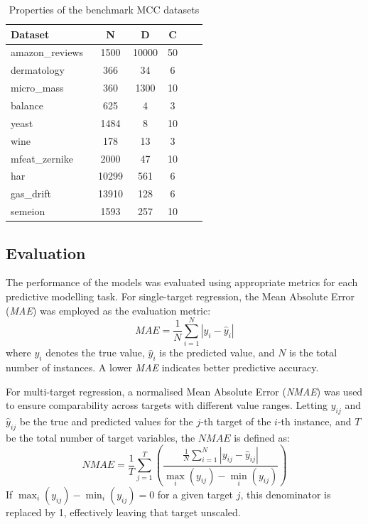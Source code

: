 \documentclass[3p,review,authoryear]{elsarticle}
\begin{document}
\begin{table}[h!]
\centering
\caption{Properties of the benchmark MCC datasets}
\label{tab:mcc}
\begin{tabular}{@{}lccccc@{}}
\toprule
\textbf{Dataset}   & \textbf{N} & \textbf{D} & \textbf{C}     \\ \midrule
amazon\_reviews~\citep{openml}                  & 1500         & 10000   &  50     \\
dermatology~\citep{openml}                     & 366         & 34     &  6   \\
micro\_mass~\citep{openml}                   & 360         & 1300      &   10    \\
balance~\citep{openml}                   & 625         & 4       & 3  \\
yeast~\citep{mulan}                   & 1484         & 8    & 10  \\
wine~\citep{openml}             &  178        & 13     &  3   \\
mfeat\_zernike~\citep{openml}                & 2000         & 47   &  10   \\
har~\citep{openml}                  & 10299         & 561        &  6   \\
gas\_drift~\citep{openml}           & 13910         & 128      &   6   \\
semeion~\citep{openml}       & 1593         & 257    &   10  \\ \bottomrule
\end{tabular}
\end{table}


\subsection{Evaluation}

The performance of the models was evaluated using appropriate metrics for each predictive modelling task. For single-target regression, the Mean Absolute Error (\textit{MAE}) was employed as the evaluation metric:
\[
\textit{MAE} = \frac{1}{N} \sum_{i=1}^{N} \left| y_i - \hat{y}_i \right|
\]
where \( y_i \) denotes the true value, \(\hat{y}_i\) is the predicted value, and \(N\) is the total number of instances. A lower \textit{MAE} indicates better predictive accuracy.

For multi-target regression, a normalised Mean Absolute Error (\textit{NMAE}) was used to ensure comparability across targets with different value ranges. Letting \(y_{ij}\) and \(\hat{y}_{ij}\) be the true and predicted values for the \(j\)-th target of the \(i\)-th instance, and \(T\) be the total number of target variables, the \(\textit{NMAE}\) is defined as:
\[
\textit{NMAE} = \frac{1}{T} \sum_{j=1}^{T} \left( \frac{\frac{1}{N} \sum_{i=1}^{N} | y_{ij} - \hat{y}_{ij} |}{\max_i(y_{ij}) - \min_i(y_{ij})} \right)
\]
If \(\max_i(y_{ij}) - \min_i(y_{ij}) = 0\) for a given target \(j\), this denominator is replaced by 1, effectively leaving that target unscaled.
\end{document}
